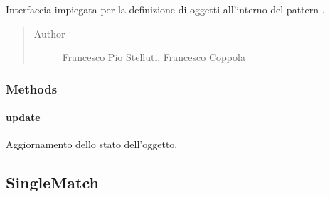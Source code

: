 \documentclass[letterpaper,10pt,italian,openany,oneside]{sphinxmanual}
\begin{document}
\begin{fulllineitems}
\label{\detokenize{source/it/unicam/cs/pa/mastermind/gamecore/Observer:it.unicam.cs.pa.mastermind.gamecore.Observer}}
Interfaccia impiegata per la definizione di oggetti  all’interno del pattern .
\begin{quote}\begin{description}
\item[{Author}] \leavevmode
Francesco Pio Stelluti, Francesco Coppola

\end{description}\end{quote}

\end{fulllineitems}



\subsubsection{Methods}
\label{\detokenize{source/it/unicam/cs/pa/mastermind/gamecore/Observer:methods}}

\paragraph{update}
\label{\detokenize{source/it/unicam/cs/pa/mastermind/gamecore/Observer:update}}

\begin{fulllineitems}
\label{\detokenize{source/it/unicam/cs/pa/mastermind/gamecore/Observer:it.unicam.cs.pa.mastermind.gamecore.Observer.update(Observable)}}
Aggiornamento dello stato dell’oggetto.

\end{fulllineitems}



\subsection{SingleMatch}
\label{\detokenize{source/it/unicam/cs/pa/mastermind/gamecore/SingleMatch:singlematch}}\label{\detokenize{source/it/unicam/cs/pa/mastermind/gamecore/SingleMatch::doc}}
\end{document}

